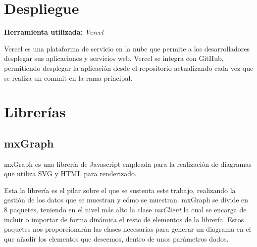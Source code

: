 \section{Despliegue}
\textbf{Herramienta utilizada: }\emph{Vercel}

Vercel es una plataforma de servicio en la nube que permite a los desarrolladores desplegar sus aplicaciones y servicios web. Vercel se integra con GitHub, permitiendo desplegar la aplicación desde el repositorio actualizando cada vez que se realiza un commit en la rama principal.

\section{Librerías}
\subsection{mxGraph}

mxGraph es una librería de Javascript empleada para la realización de diagramas que utiliza SVG y HTML para renderizado.

Esta la librería es el pilar sobre el que se sustenta este trabajo, realizando la gestión de los datos que se muestran y cómo se muestran. mxGraph se divide en 8 paquetes, teniendo en el nivel más alto la clase \emph{mxClient} la cual se encarga de incluir o importar de forma dinámica el resto de elementos de la librería. Estos paquetes nos proporcionarán las clases necesarias para generar un diagrama en el que añadir los elementos que deseemos, dentro de unos parámetros dados\cite{mxg-api}.
